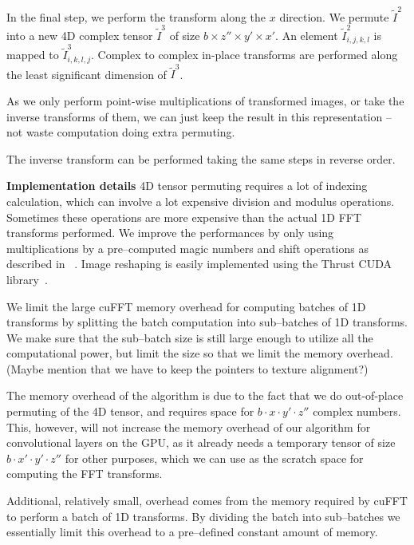 \documentclass[conference]{./IEEEtran/IEEEtran}
\begin{document}
  In the final step, we perform the transform along the $x$ direction.
  We permute $\widetilde{I}^2$ into a new 4D complex tensor
  $\widetilde{I}^3$ of size $b \times z'' \times y' \times x'$.  An
  element $\widetilde{I}^2_{i,j,k,l}$ is mapped to
  $\widetilde{I}^3_{i,k,l,j}$.  Complex to complex in-place transforms
  are performed along the least significant dimension of
  $\widetilde{I}^3$.

  As we only perform point-wise multiplications of transformed images,
  or take the inverse transforms of them, we can just keep the result
  in this representation -- not waste computation doing extra
  permuting.

  The inverse transform can be performed taking the same steps in
  reverse order.

  {\bf Implementation details} 4D tensor permuting requires a lot of
  indexing calculation, which can involve a lot expensive division and
  modulus operations.  Sometimes these operations are more expensive
  than the actual 1D FFT transforms performed.  We improve the
  performances by only using multiplications by a pre--computed magic
  numbers and shift operations as described in
  ~\cite{warren2013hacker}.  Image reshaping is easily implemented
  using the Thrust CUDA library~\cite{bell2011thrust}.

  We limit the large cuFFT memory overhead for computing batches of 1D
  transforms by splitting the batch computation into sub--batches of
  1D transforms.  We make sure that the sub--batch size is still large
  enough to utilize all the computational power, but limit the size so
  that we limit the memory overhead.  (Maybe mention that we have to
  keep the pointers to texture alignment?)

  The memory overhead of the algorithm is due to the fact that we do
  out-of-place permuting of the 4D tensor, and requires space for $b
  \cdot x \cdot y' \cdot z''$ complex numbers.  This, however, will
  not increase the memory overhead of our algorithm for convolutional
  layers on the GPU, as it already needs a temporary tensor of size $b
  \cdot x' \cdot y' \cdot z''$ for other purposes, which we can use as
  the scratch space for computing the FFT transforms.

  Additional, relatively small, overhead comes from the memory
  required by cuFFT to perform a batch of 1D transforms.  By dividing
  the batch into sub--batches we essentially limit this overhead to a
  pre--defined constant amount of memory.
\end{document}
